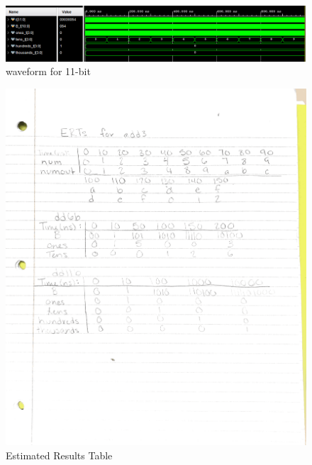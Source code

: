 \documentclass[11pt]{article}
\begin{document}
\begin{figure}
	\includegraphics[width= \textwidth]{dd11bsc.png}
	\caption{waveform for 11-bit}\label{fig:dd11b}
\end{figure}
\begin{figure}
	\includegraphics[width= \textwidth]{ERT.png}
	\caption{Estimated Results Table }\label{fig:ERT}
\end{figure}
\end{document}
